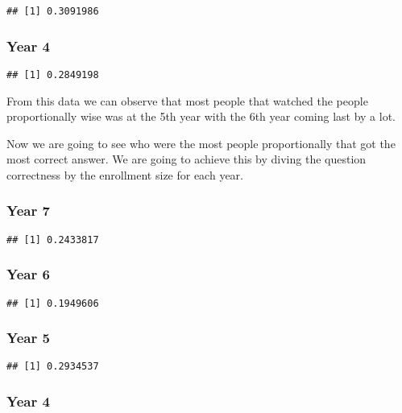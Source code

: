 \documentclass[
]{article}
\begin{document}
\begin{verbatim}
## [1] 0.3091986
\end{verbatim}

\hypertarget{year-4-3}{%
\subsubsection{Year 4}\label{year-4-3}}

\begin{verbatim}
## [1] 0.2849198
\end{verbatim}

From this data we can observe that most people that watched the people
proportionally wise was at the 5th year with the 6th year coming last by
a lot.

Now we are going to see who were the most people proportionally that got
the most correct answer. We are going to achieve this by diving the
question correctness by the enrollment size for each year.

\hypertarget{year-7-4}{%
\subsubsection{Year 7}\label{year-7-4}}

\begin{verbatim}
## [1] 0.2433817
\end{verbatim}

\hypertarget{year-6-4}{%
\subsubsection{Year 6}\label{year-6-4}}

\begin{verbatim}
## [1] 0.1949606
\end{verbatim}

\hypertarget{year-5-4}{%
\subsubsection{Year 5}\label{year-5-4}}

\begin{verbatim}
## [1] 0.2934537
\end{verbatim}

\hypertarget{year-4-4}{%
\subsubsection{Year 4}\label{year-4-4}}
\end{document}
